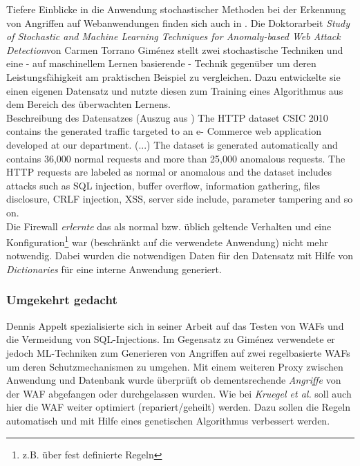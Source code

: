 Tiefere Einblicke in die Anwendung stochastischer Methoden bei der Erkennung von Angriffen auf Webanwendungen finden sich auch in \cite{Giménez2015}. Die Doktorarbeit \glqq\emph{Study of Stochastic and Machine Learning Techniques for Anomaly-based Web Attack Detection}\grqq von Carmen Torrano Giménez stellt zwei stochastische Techniken und eine - auf maschinellem Lernen basierende - Technik gegenüber um deren Leistungsfähigkeit am praktischen Beispiel zu vergleichen. Dazu entwickelte sie einen eigenen Datensatz\cite{csic2010} und nutzte diesen zum Training eines Algorithmus aus dem Bereich des überwachten Lernens.\\

\textcolor{bhtGray}{ Beschreibung des Datensatzes (Auszug aus \cite{csic2010})} The HTTP dataset CSIC 2010 contains the generated traffic targeted to an e- Commerce web application developed at our department. (...) The dataset is generated automatically and contains 36,000 normal requests and more than 25,000 anomalous requests. The HTTP requests are labeled as normal or anomalous and the dataset includes attacks such as SQL injection, buffer overflow, information gathering, files disclosure, CRLF injection, XSS, server side include, parameter tampering and so on.\\

Die Firewall \emph{erlernte} das als normal bzw. üblich geltende Verhalten und eine Konfiguration\footnote{z.B. über fest definierte Regeln} war (beschränkt auf die verwendete Anwendung) nicht mehr notwendig. Dabei wurden die notwendigen Daten für den Datensatz mit Hilfe von \emph{Dictionaries} für eine interne Anwendung generiert. 


\subsubsection{Umgekehrt gedacht}

Dennis Appelt spezialisierte sich in seiner Arbeit \cite{Appelt2016} auf das Testen von WAFs und die Vermeidung von SQL-Injections. Im Gegensatz zu Giménez verwendete er jedoch ML-Techniken zum Generieren von Angriffen auf zwei regelbasierte WAFs um deren Schutzmechanismen zu umgehen. Mit einem weiteren Proxy zwischen Anwendung und Datenbank wurde überprüft ob dementsrechende \emph{Angriffe} von der WAF abgefangen oder durchgelassen wurden. Wie bei \emph{Kruegel et al.} soll auch hier die WAF weiter optimiert (repariert/geheilt) werden. Dazu sollen die Regeln automatisch und mit Hilfe eines genetischen Algorithmus verbessert werden.
